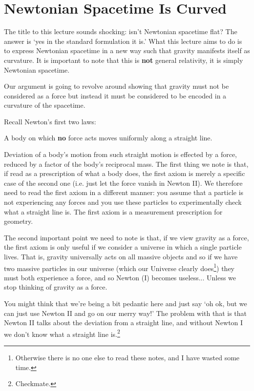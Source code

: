 \chapter{Newtonian Spacetime Is Curved}

The title to this lecture sounds shocking: isn't Newtonian spacetime flat? The answer is `yes in the standard formulation it is.' What this lecture aims to do is to express Newtonian spacetime in a new way such that gravity manifests itself as curvature. It is important to note that this is \textbf{not} general relativity, it is simply Newtonian spacetime.

Our argument is going to revolve around showing that gravity must not be considered as a force but instead it must be considered to be encoded in a curvature of the spacetime. 

Recall Newton's first two laws:
\ben[label=(\Roman*)] 
    \item A body on which \textbf{no} force acts moves uniformly along a straight line. 
    \item Deviation of a body's motion from such straight motion is effected by a force, reduced by a factor of the body's reciprocal mass.
\een 
The first thing we note is that, if read as a prescription of what a body does, the first axiom is merely a specific case of the second one (i.e. just let the force vanish in Newton II). We therefore need to read the first axiom in a different manner: you assume that a particle is not experiencing any forces and you use these particles to experimentally check what a straight line is. The first axiom is a measurement prescription for geometry. 

The second important point we need to note is that, if we view gravity as a force, the first axiom is only useful if we consider a universe in which a single particle lives. That is, gravity universally acts on all massive objects and so if we have two massive particles in our universe (which our Universe clearly does\footnote{Otherwise there is no one else to read these notes, and I have wasted some time.}) they must both experience a force, and so Newton (I) becomes useless... Unless we stop thinking of gravity as a force.

\br 
    You might think that we're being a bit pedantic here and just say `oh ok, but we can just use Newton II and go on our merry way!' The problem with that is that Newton II talks about the deviation from a straight line, and without Newton I we don't know what a straight line is.\footnote{Checkmate.}
\er 

